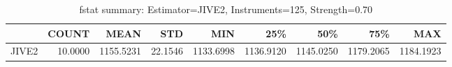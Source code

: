 \begin{table}[ht]
\centering
\caption{fstat summary: Estimator=JIVE2, Instruments=125, Strength=0.70}
\begin{tabular}{lrrrrrrrr}
\toprule
 & COUNT & MEAN & STD & MIN & 25\% & 50\% & 75\% & MAX \\
\midrule
JIVE2 & 10.0000 & 1155.5231 & 22.1546 & 1133.6998 & 1136.9120 & 1145.0250 & 1179.2065 & 1184.1923 \\
\bottomrule
\end{tabular}
\end{table}
